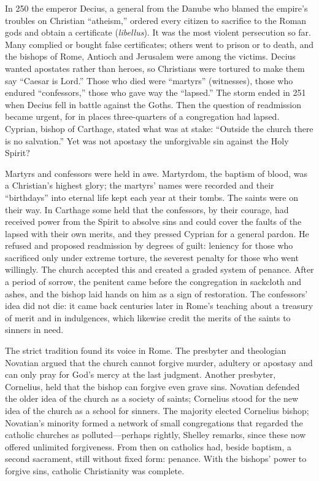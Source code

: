 In 250 the emperor Decius, a general from the Danube who blamed the empire's troubles on Christian
``atheism,'' ordered every citizen to sacrifice to the Roman gods and obtain a certificate
(\emph{libellus}). It was the most violent persecution so far. Many complied or bought false
certificates; others went to prison or to death, and the bishops of Rome, Antioch and Jerusalem were among the victims. Decius wanted apostates rather than heroes, so Christians were tortured to make them say
``Caesar is Lord.'' Those who died were ``martyrs'' (witnesses), those who endured ``confessors,''
those who gave way the ``lapsed.'' The storm ended in 251 when Decius fell in battle against the
Goths. Then the question of readmission became urgent, for in places three-quarters of a congregation
had lapsed. Cyprian, bishop of Carthage, stated what was at stake: ``Outside the church there is no
salvation.'' Yet was not apostasy the unforgivable sin against the Holy Spirit?

Martyrs and confessors were held in awe. Martyrdom, the baptism of blood, was a Christian's highest
glory; the martyrs' names were recorded and their ``birthdays'' into eternal life kept each year at
their tombs. The saints were on their way. In Carthage some held that the confessors, by their
courage, had received power from the Spirit to absolve sins and could cover the faults of the lapsed
with their own merits, and they pressed Cyprian for a general pardon. He refused and proposed
readmission by degrees of guilt: leniency for those who sacrificed only under extreme torture, the
severest penalty for those who went willingly. The church accepted this and created a graded system of
penance. After a period of sorrow, the penitent came before the congregation in sackcloth and ashes,
and the bishop laid hands on him as a sign of restoration. The confessors' idea did not die: it came back centuries later in Rome's teaching about a treasury of merit and in indulgences, which likewise credit the merits of the saints to sinners in need.

The strict tradition found its voice in Rome. The presbyter and theologian Novatian argued that the
church cannot forgive murder, adultery or apostasy and can only pray for God's mercy at the last
judgment. Another presbyter, Cornelius, held that the bishop can forgive even grave sins. Novatian
defended the older idea of the church as a society of saints; Cornelius stood for the new idea of the
church as a school for sinners. The majority elected Cornelius bishop; Novatian's minority formed a
network of small congregations that regarded the catholic churches as polluted---perhaps rightly,
Shelley remarks, since these now offered unlimited forgiveness. From then on catholics had, beside
baptism, a second sacrament, still without fixed form: penance. With the bishops' power to forgive
sins, catholic Christianity was complete.

